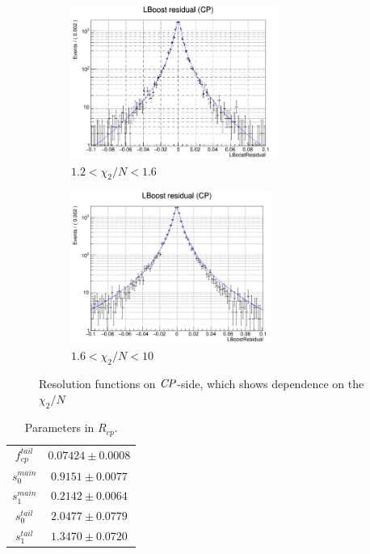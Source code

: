 \begin{figure}[H]
	\begin{subfigure}{0.5\linewidth}
		\caption{$1.2<\chi_2/N<1.6$}
		\includegraphics[height=5cm]{figures/residual1.2_1.6}
	\end{subfigure}
	\begin{subfigure}{0.5\linewidth}
		\caption{$1.6<\chi_2/N<10$}
		\includegraphics[height=5cm]{figures/residual1.6_10}
	\end{subfigure}
	\caption{Resolution functions on $\it{CP}$-side, which shows dependence on the $\chi_2/N$}
\end{figure}

\begin{table}[H]
	\begin{minipage}[b]{1.0\linewidth}
		\centering
		\caption{Parameters in $R_{cp}$.}
		\begin{tabular}{|c|c|}
			\hline
			$f_{cp}^{tail}$ & $0.07424 \pm 0.0008$\\
			$s_0^{main}$&  $0.9151 \pm 0.0077$ \\
			$s_1^{main}$ & $0.2142\pm 0.0064$\\
			$s_0^{tail}$ &  $2.0477\pm 0.0779$\\
			$s_1^{tail}$  & $1.3470\pm 0.0720$ \\
			\hline
		\end{tabular}
	\end{minipage}
\end{table}

